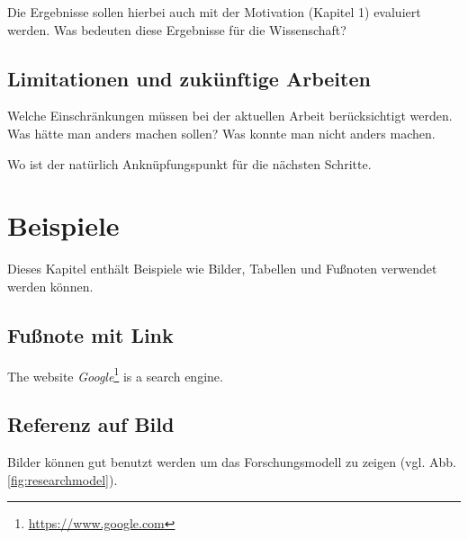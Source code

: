 Die Ergebnisse sollen hierbei auch mit der Motivation (Kapitel 1) evaluiert werden. Was bedeuten diese Ergebnisse für die Wissenschaft?




\subsection{Limitationen und zukünftige Arbeiten}
Welche Einschränkungen müssen bei der aktuellen Arbeit berücksichtigt werden. Was hätte man anders machen sollen? Was konnte man nicht anders machen.

Wo ist der natürlich Anknüpfungspunkt für die nächsten Schritte.




\newpage
\section{Beispiele}
Dieses Kapitel enthält Beispiele wie Bilder, Tabellen und Fußnoten verwendet werden können.

\subsection{Fußnote mit Link}

The website \textit{Google}\footnote{\url{https://www.google.com}} is a search engine. 


\subsection{Referenz auf Bild}
Bilder können gut benutzt werden um das Forschungsmodell zu zeigen (vgl. Abb. \ref{fig:researchmodel}).

